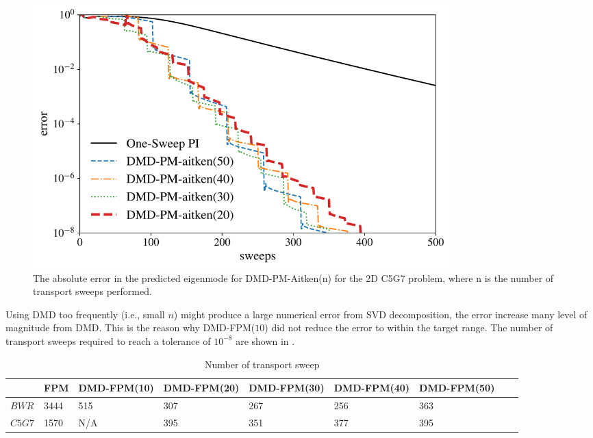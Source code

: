 \begin{figure}[htb]%
    \centering
    \includegraphics[height=4.0in]{tex/figures/dmd_ospi_semilog_c5g7.pdf}
    \caption{The absolute error in the predicted eigenmode for DMD-PM-Aitken(n) for the 2D C5G7 problem, where n is the number of transport sweeps performed.}
    \label{fig:DMD-FPM_2d}
\end{figure}

Using DMD too frequently (i.e., small $n$) might produce a large numerical error from SVD decomposition, the error increase many level of magnitude from DMD.
This is the reason why DMD-FPM($10$) did not reduce the error to within the target range.
The number of transport sweeps required to reach a tolerance of $10^{-8}$ are shown in .

\begin{table}[htb]
  \centering
  \small
  \caption{Number of transport sweep}
  \begin{tabular}{lllllllll}\toprule
      & FPM  & DMD-FPM(10)& DMD-FPM(20)& DMD-FPM(30)& DMD-FPM(40)& DMD-FPM(50)
\\ \midrule
$BWR$  & 3444 & 515 & 307 & 267 & 256 & 363
\\
$C5G7$  & 1570  & N/A & 395 & 351 & 377 & 395
\\
\bottomrule
\end{tabular}
  \label{tab:widetable}
\end{table}
